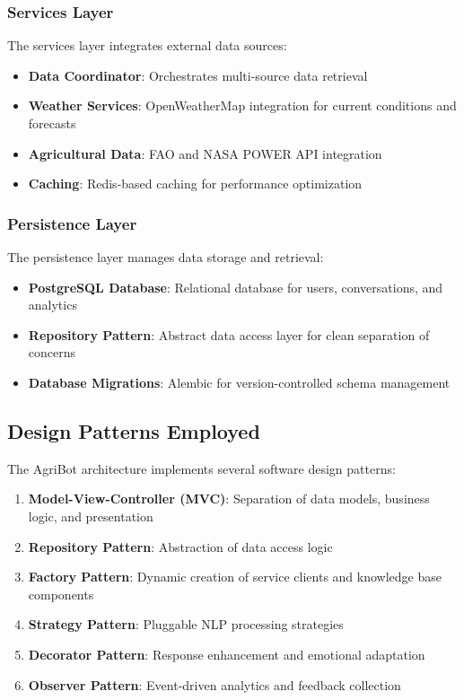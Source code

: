 \documentclass[12pt,a4paper]{article}
\begin{document}
\subsubsection{Services Layer}

The services layer integrates external data sources:

\begin{itemize}[leftmargin=*]
    \item \textbf{Data Coordinator}: Orchestrates multi-source data retrieval
    \item \textbf{Weather Services}: OpenWeatherMap integration for current conditions and forecasts
    \item \textbf{Agricultural Data}: FAO and NASA POWER API integration
    \item \textbf{Caching}: Redis-based caching for performance optimization
\end{itemize}

\subsubsection{Persistence Layer}

The persistence layer manages data storage and retrieval:

\begin{itemize}[leftmargin=*]
    \item \textbf{PostgreSQL Database}: Relational database for users, conversations, and analytics
    \item \textbf{Repository Pattern}: Abstract data access layer for clean separation of concerns
    \item \textbf{Database Migrations}: Alembic for version-controlled schema management
\end{itemize}

\subsection{Design Patterns Employed}

The AgriBot architecture implements several software design patterns:

\begin{enumerate}[leftmargin=*]
    \item \textbf{Model-View-Controller (MVC)}: Separation of data models, business logic, and presentation
    \item \textbf{Repository Pattern}: Abstraction of data access logic
    \item \textbf{Factory Pattern}: Dynamic creation of service clients and knowledge base components
    \item \textbf{Strategy Pattern}: Pluggable NLP processing strategies
    \item \textbf{Decorator Pattern}: Response enhancement and emotional adaptation
    \item \textbf{Observer Pattern}: Event-driven analytics and feedback collection
\end{enumerate}
\end{document}

